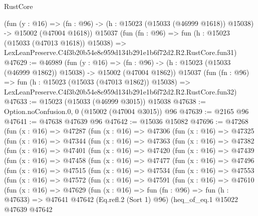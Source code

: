\begin{lexlean}{RustCore}
\begin{coremodule}
    (fun (y : @16) =>
    (fn : @96) -> (h : @15023 (@15033 (@46999 @1618)) @15038) -> @15002 (@47004 @1618))
    @15037
    (fun (fn : @96) =>
    fun (h : @15023 (@15033 (@47013 @1618)) @15038) =>
    LexLeanPreserve.C4f3b20b54e8e959d134b291e1b6f72d2.R2.RustCore.fun31)
@47629 := @46989
    (fun (y : @16) =>
    (fn : @96) -> (h : @15023 (@15033 (@46999 @1862)) @15038) -> @15002 (@47004 @1862))
    @15037
    (fun (fn : @96) =>
    fun (h : @15023 (@15033 (@47013 @1862)) @15038) =>
    LexLeanPreserve.C4f3b20b54e8e959d134b291e1b6f72d2.R2.RustCore.fun32)
@47633 := @15023 (@15033 (@46999 @3015)) @15038
@47638 := Option.noConfusion.{0, 0} (@15002 (@47004 @3015)) @96
@47639 := @2165 @96
@47641 := @47638 @47639 @96
@47642 := @15036 @15082
@47696 := @47268
    (fun (x : @16) =>
    @47287
      (fun (x : @16) =>
      @47306
        (fun (x : @16) =>
        @47325
          (fun (x : @16) =>
          @47344
            (fun (x : @16) =>
            @47363
              (fun (x : @16) =>
              @47382
                (fun (x : @16) =>
                @47401
                  (fun (x : @16) =>
                  @47420
                    (fun (x : @16) =>
                    @47439
                      (fun (x : @16) =>
                      @47458
                        (fun (x : @16) =>
                        @47477
                          (fun (x : @16) =>
                          @47496
                            (fun (x : @16) =>
                            @47515
                              (fun (x : @16) =>
                              @47534
                                (fun (x : @16) =>
                                @47553
                                  (fun (x : @16) =>
                                  @47572
                                    (fun (x : @16) =>
                                    @47591
                                      (fun (x : @16) =>
                                      @47610
                                        (fun (x : @16) =>
                                        @47629
                                          (fun (x : @16) =>
                                          fun (fn : @96) =>
                                          fun (h : @47633) =>
                                          @47641
                                            @47642
                                            (Eq.refl.{2} (Sort 1) @96)
                                            (heq_of_eq.{1}
                                              @15022
                                              @47639
                                              @47642

\end{coremodule}
\end{lexlean}
